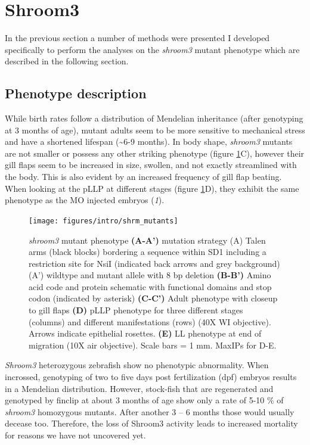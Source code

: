 \documentclass[11pt,singlespacinge,twoside]{reedthesis} %
\theoremstyle{definition}
\theoremstyle{definition}
\theoremstyle{definition}
\theoremstyle{remark}
\begin{document}
\hypertarget{shroom3}{%
\section{Shroom3}\label{shroom3}}

In the previous section a number of methods were presented I developed specifically to perform the analyses on the \emph{shroom3} mutant phenotype which are described in the following section.

\hypertarget{intro-phen}{%
\subsection{Phenotype description}\label{intro-phen}}

While birth rates follow a distribution of Mendelian inheritance (after genotyping at 3 months of age), mutant adults seem to be more sensitive to mechanical stress and have a shortened lifespan (\textasciitilde6-9 months). In body shape, \emph{shroom3} mutants are not smaller or possess any other striking phenotype (figure \ref{fig:shrmmut}C), however their gill flaps seem to be increased in size, swollen, and not exactly streamlined with the body. This is also evident by an increased frequency of gill flap beating. When looking at the pLLP at different stages (figure \ref{fig:shrmmut}D), they exhibit the same phenotype as the MO injected embryos (\emph{1}).


\begin{figure}

{\centering \texttt{[image: figures/intro/shrm\_mutants]} 

}

\caption[shroom3 mutant phenotype]{\emph{shroom3} mutant phenotype \textbf{(A-A')} mutation strategy (A) Talen arms (black blocks) bordering a sequence within SD1 including a restriction site for NsiI (indicated back arrows and grey background) (A') wildtype and mutant allele with 8 bp deletion \textbf{(B-B')} Amino acid code and protein schematic with functional domains and stop codon (indicated by asterisk) \textbf{(C-C')} Adult phenotype with closeup to gill flaps \textbf{(D)} pLLP phenotype for three different stages (columns) and different manifestations (rows) (40X WI objective). Arrows indicate epithelial rosettes. \textbf{(E)} LL phenotype at end of migration (10X air objective). Scale bars = 1 mm. MaxIPs for D-E.}\label{fig:shrmmut}
\end{figure}
\emph{Shroom3} heterozygous zebrafish show no phenotypic abnormality. When incrossed, genotyping of two to five days post fertilization (dpf) embryos results in a Mendelian distribution. However, stock-fish that are regenerated and genotyped by finclip at about 3 months of age show only a rate of 5-10 \(\%\) of \emph{shroom3} homozygous mutants. After another 3 -- 6 months those would usually decease too. Therefore, the loss of Shroom3 activity leads to increased mortality for reasons we have not uncovered yet.
\end{document}
